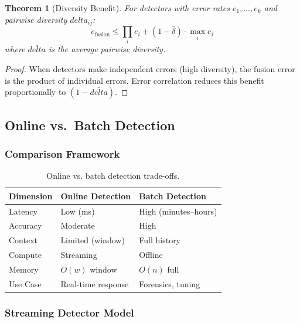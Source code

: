 \documentclass[
]{article}
\newtheorem{theorem}{Theorem}[section]
\begin{document}
\begin{theorem}[Diversity Benefit]
\label{thm:diversity-benefit}
For detectors with error rates $e_1, \ldots, e_k$ and pairwise diversity $delta_{ij}$:
\begin{equation}
\label{eq:diversity-benefit}
e_{\text{fusion}} \leq \prod_i e_i + (1 - \bar{\delta}) \cdot \max_i e_i
\end{equation}
where $\bar{delta}$ is the average pairwise diversity.
\end{theorem}

\begin{proof}
When detectors make independent errors (high diversity), the fusion error is the product of individual errors. Error correlation reduces this benefit proportionally to $(1 - \bar{delta})$.
\end{proof}

\subsection{Online vs.~Batch Detection}\label{sec:online-batch}

\subsubsection{Comparison Framework}\label{comparison-framework}

\begin{table}[htbp]
\centering
\caption{Online vs. batch detection trade-offs.}
\label{tab:online-batch-comparison}
\begin{tabular}{@{}lll@{}}
\toprule
Dimension & Online Detection & Batch Detection \\
\midrule
Latency & Low (ms) & High (minutes--hours) \\
Accuracy & Moderate & High \\
Context & Limited (window) & Full history \\
Compute & Streaming & Offline \\
Memory & $O(w)$ window & $O(n)$ full \\
Use Case & Real-time response & Forensics, tuning \\
\bottomrule
\end{tabular}
\end{table}

\subsubsection{Streaming Detector Model}\label{streaming-detector-model}
\end{document}

